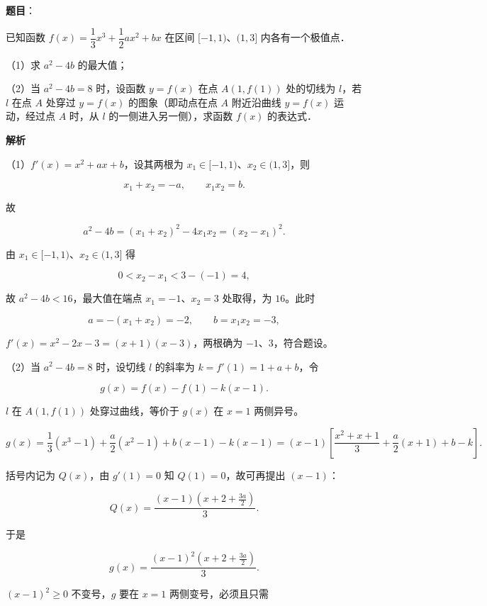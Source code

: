 \begin{answer}

\textbf{题目}：

已知函数 $f(x)=\dfrac13x^3+\dfrac12ax^2+bx$ 在区间 $[-1,1)$、$(1,3]$ 内各有一个极值点．

（1）求 $a^2-4b$ 的最大值；

（2）当 $a^2-4b=8$ 时，设函数 $y=f(x)$ 在点 $A(1,f(1))$ 处的切线为 $l$，若 $l$ 在点 $A$ 处穿过 $y=f(x)$ 的图象（即动点在点 $A$ 附近沿曲线 $y=f(x)$ 运动，经过点 $A$ 时，从 $l$ 的一侧进入另一侧），求函数 $f(x)$ 的表达式．

\textbf{解析}

（1）$f'(x)=x^2+ax+b$，设其两根为 $x_1\in[-1,1)$、$x_2\in(1,3]$，则

\nopagebreak[4]
\[x_1+x_2=-a,\qquad x_1x_2=b .\]

故

\nopagebreak[4]
\[a^2-4b=(x_1+x_2)^2-4x_1x_2=(x_2-x_1)^2 .\]

由 $x_1\in[-1,1)$、$x_2\in(1,3]$ 得

\nopagebreak[4]
\[0<x_2-x_1<3-(-1)=4,\]

故 $a^2-4b<16$，最大值在端点 $x_1=-1$、$x_2=3$ 处取得，为 $16$。此时

\nopagebreak[4]
\[a=-(x_1+x_2)=-2,\qquad b=x_1x_2=-3,\]

$f'(x)=x^2-2x-3=(x+1)(x-3)$，两根确为 $-1$、$3$，符合题设。

（2）当 $a^2-4b=8$ 时，设切线 $l$ 的斜率为 $k=f'(1)=1+a+b$，令

\nopagebreak[4]
\[g(x)=f(x)-f(1)-k(x-1).\]

$l$ 在 $A(1,f(1))$ 处穿过曲线，等价于 $g(x)$ 在 $x=1$ 两侧异号。

\nopagebreak[4]
\[g(x)=\frac13(x^3-1)+\frac a2(x^2-1)+b(x-1)-k(x-1)
=(x-1)\left[\frac{x^2+x+1}{3}+\frac a2(x+1)+b-k\right].\]

括号内记为 $Q(x)$，由 $g'(1)=0$ 知 $Q(1)=0$，故可再提出 $(x-1)$：

\nopagebreak[4]
\[Q(x)=\frac{(x-1)\left(x+2+\frac{3a}{2}\right)}{3}.\]

于是

\nopagebreak[4]
\[g(x)=\frac{(x-1)^2\left(x+2+\frac{3a}{2}\right)}{3}.\]

$(x-1)^2\geqslant0$ 不变号，$g$ 要在 $x=1$ 两侧变号，必须且只需


\end{answer}
